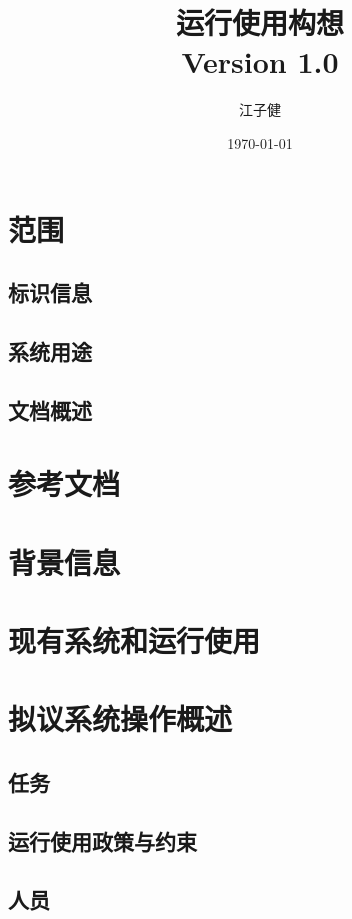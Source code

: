 \documentclass{ctexart}
\title{运行使用构想\\{\large Version 1.0}}
\author{江子健}
\date{\today}
\begin{document}
\maketitle
\newpage

\tableofcontents

\newpage
\section{范围}

\subsection{标识信息}

\subsection{系统用途}

\subsection{文档概述}

\newpage
\section{参考文档}

\newpage
\section{背景信息}

\newpage
\section{现有系统和运行使用}

\newpage
\section{拟议系统操作概述}

\subsection{任务}

\subsection{运行使用政策与约束}

\subsection{人员}
\end{document}
